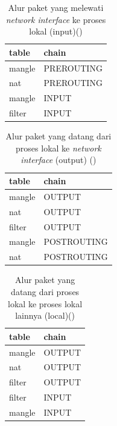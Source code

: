 \begin{table}[H]
	\caption{Alur paket yang melewati \textit{network interface} ke proses lokal (input)(\cite{purdy2004linux})}
	\label{table:network_to_local}
	\centering
	\begin{tabular}{ll}
		\hline
		\rowcolor[HTML]{C0C0C0} 
		table  & chain      \\ \hline
		mangle & PREROUTING \\
		nat    & PREROUTING \\
		mangle & INPUT      \\
		filter & INPUT      \\ \hline
	\end{tabular}	
\end{table}

\begin{table}[H]
	\caption{Alur paket yang datang dari proses lokal ke \textit{network interface} (output) (\cite{purdy2004linux})}
	\label{table:local_to_network}
	\centering
	\begin{tabular}{ll}
		\hline
		\rowcolor[HTML]{C0C0C0} 
		table  & chain       \\ \hline
		mangle & OUTPUT      \\
		nat    & OUTPUT      \\
		filter & OUTPUT      \\
		mangle & POSTROUTING \\
		nat    & POSTROUTING \\ \hline
	\end{tabular}
\end{table}

\begin{table}[H]
	\caption{Alur paket yang datang dari proses lokal ke proses lokal lainnya (local)(\cite{purdy2004linux})}
	\label{table:local_to_local}
	\centering
	\begin{tabular}{ll}
		\hline
		\rowcolor[HTML]{C0C0C0} 
		table  & chain  \\ \hline
		mangle & OUTPUT \\
		nat    & OUTPUT \\
		filter & OUTPUT \\
		filter & INPUT  \\
		mangle & INPUT  \\ \hline
	\end{tabular}
\end{table}
